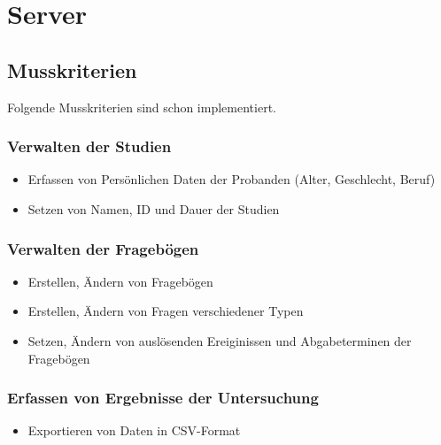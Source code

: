 \documentclass[a4paper]{scrreprt}
\begin{document}
        \section{Server}
        \subsection{Musskriterien}
                \par
                Folgende Musskriterien sind schon implementiert.
                        \subsubsection{Verwalten der Studien}
                            \begin{itemize}
                                \item Erfassen von Pers\"onlichen Daten der Probanden (Alter, Geschlecht, Beruf)
                                \item Setzen von Namen, ID und Dauer der Studien
                            \end{itemize}
                        \subsubsection{Verwalten der Frageb\"ogen}
                            \begin{itemize}
                                \item Erstellen, \"Andern von Frageb\"ogen
                                \item Erstellen, \"Andern von Fragen verschiedener Typen
                                \item Setzen, \"Andern von ausl\"osenden Ereiginissen und Abgabeterminen der Frageb\"ogen
                            \end{itemize}
                        \subsubsection{Erfassen von Ergebnisse der Untersuchung}
                            \begin{itemize}
                                \item Exportieren von Daten in CSV-Format
                            \end{itemize}
                        \vspace*{0.5cm}
\end{document}
